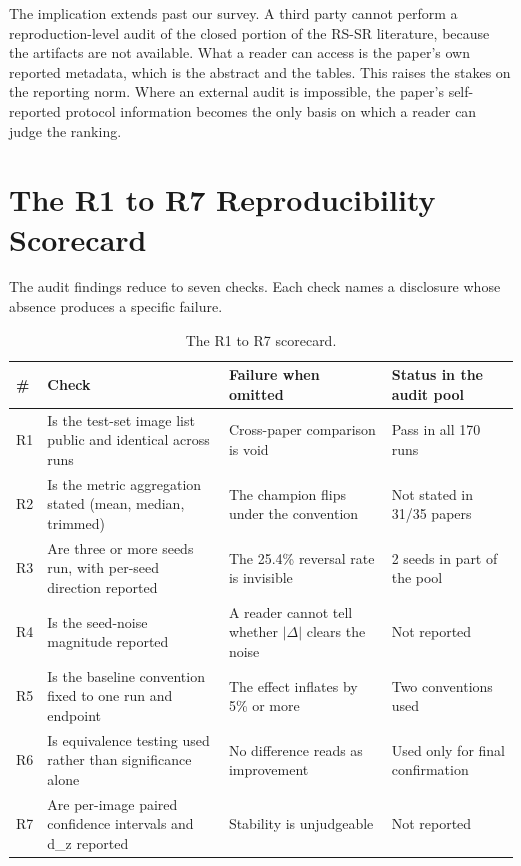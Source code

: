 \documentclass[journal,twoside,10pt]{IEEEtran}
\newlength{\tblavail}
\begin{document}
The implication extends past our survey. A third party cannot perform a reproduction-level audit of the closed portion of the RS-SR literature, because the artifacts are not available. What a reader can access is the paper's own reported metadata, which is the abstract and the tables. This raises the stakes on the reporting norm. Where an external audit is impossible, the paper's self-reported protocol information becomes the only basis on which a reader can judge the ranking.

\section{The R1 to R7 Reproducibility Scorecard}


The audit findings reduce to seven checks. Each check names a disclosure whose absence produces a specific failure.

\begin{table}[!t]
\caption{The R1 to R7 scorecard.}
\label{tab:IX}
\centering
\small
\setlength{\tabcolsep}{3pt}
\setlength{\tblavail}{\dimexpr\columnwidth-8\tabcolsep\relax}
\begin{tabular}{p{0.038\tblavail}p{0.384\tblavail}p{0.321\tblavail}p{0.227\tblavail}}
\hline
\# & Check & Failure when omitted & Status in the audit pool \\
\hline
R1 & Is the test-set image list public and identical across runs & Cross-paper comparison is void & Pass in all 170 runs \\
R2 & Is the metric aggregation stated (mean, median, trimmed) & The champion flips under the convention & Not stated in 31/35 papers \\
R3 & Are three or more seeds run, with per-seed direction reported & The 25.4\% reversal rate is invisible & 2 seeds in part of the pool \\
R4 & Is the seed-noise magnitude reported & A reader cannot tell whether $|$$\Delta$$|$ clears the noise & Not reported \\
R5 & Is the baseline convention fixed to one run and endpoint & The effect inflates by 5\% or more & Two conventions used \\
R6 & Is equivalence testing used rather than significance alone & No difference reads as improvement & Used only for final confirmation \\
R7 & Are per-image paired confidence intervals and d\_z reported & Stability is unjudgeable & Not reported \\
\hline
\end{tabular}
\end{table}
\end{document}

